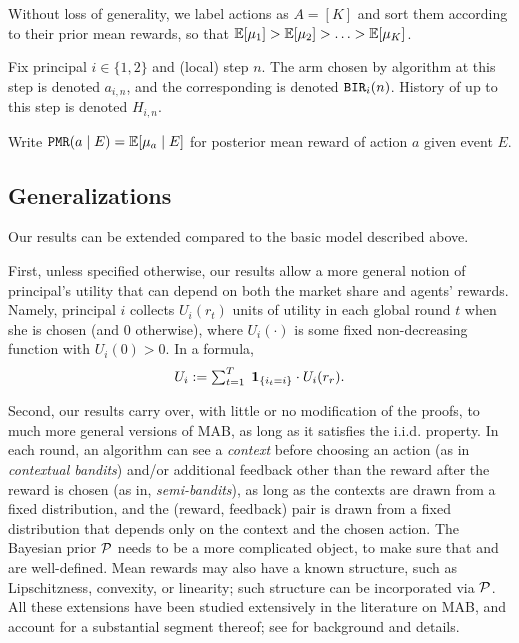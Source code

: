  Without loss of generality, we label actions as $A=[K]$ and sort them according to their prior mean rewards, so that
    $ \E[\mu_1] > \E[\mu_2] > \ldots > \E[\mu_K]$.

Fix principal $i\in \{1,2\}$ and (local) step $n$. The arm chosen by algorithm \alg[i] at this step is denoted $a_{i,n}$, and the corresponding \BIR is denoted $\mathtt{BIR}_i(n)$. History of \alg[i] up to this step is denoted $H_{i,n}$.

Write
    $\PMR(a\mid E) = \E[\mu_a \mid E]$
for posterior mean reward of action $a$ given event $E$.


\subsection{Generalizations}
\label{sec:model-extensions}

Our results can be extended compared to the basic model described above.


First, unless specified otherwise, our results allow a more general notion of principal's utility that can depend on both the market share and agents' rewards. Namely, principal $i$ collects $U_i(r_t)$ units of utility in each global round $t$ when she is chosen (and $0$ otherwise), where $U_i(\cdot)$ is some fixed non-decreasing function with $U_i(0)>0$. In a formula,
\begin{align}\label{eq:general-utility}
\textstyle U_i := \sum_{t=1}^T\; {\bf 1}_{\{i_t=i\}}\cdot U_i(r_r).
\end{align}

Second, our results carry over, with little or no modification of the proofs, to much more general versions of MAB, as long as it satisfies the i.i.d. property. In each round, an algorithm can see a \emph{context} before choosing an action (as in \emph{contextual bandits}) and/or additional feedback other than the reward after the reward is chosen (as in, \eg \emph{semi-bandits}), as long as the contexts are drawn from a fixed distribution, and the (reward, feedback) pair is drawn from a fixed distribution that depends only on the context and the chosen action. The Bayesian prior $\mathcal{P}$ needs to be a more complicated object, to make sure that \PMR and \BIR are well-defined. Mean rewards may also have a known structure, such as Lipschitzness, convexity, or linearity; such structure can be incorporated via $\mathcal{P}$. All these extensions have been studied extensively in the literature on MAB, and account for a substantial segment thereof; see \cite{Bubeck-survey12} for background and details.

